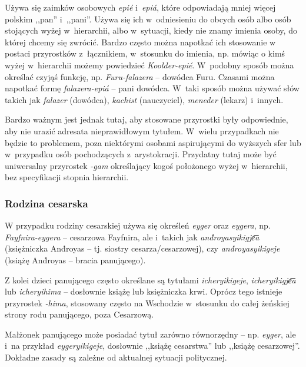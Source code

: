 \begin{spacing}{1.1}
\skipline

Używa się zaimków osobowych \emph{epié} i~\emph{epiá}, które odpowiadają mniej
więcej polskim ,,pan'' i~,,pani''. Używa się ich w~odniesieniu do obcych osób albo
osób stojących wyżej w~hierarchii, albo w~sytuacji, kiedy nie znamy imienia 
osoby, do której chcemy się zwrócić. Bardzo często można napotkać ich stosowanie
w postaci przyrostków z~łącznikiem, w~stosunku do imienia, np. mówiąc o kimś
wyżej w~hierarchii możemy powiedzieć \emph{Koolder-epié}. W~podobny sposób
można określać czyjąś funkcję, np. \emph{Furu-falazera} -- dowódca Furu. Czasami
można napotkać formę \emph{falazera-epiá} -- pani dowódca. W~taki sposób można
używać słów takich jak \emph{falazer} (dowódca), \emph{kachist} (nauczyciel), 
\emph{meneder} (lekarz) i~innych.

Bardzo ważnym jest jednak tutaj, aby stosowane przyrostki były odpowiednie, aby
nie urazić adresata nieprawidłowym tytułem. W~wielu przypadkach nie będzie to
problemem, poza niektórymi osobami aspirującymi do wyższych sfer lub w~przypadku
osób pochodzących z~arystokracji. Przydatny tutaj może być uniwersalny 
przyrostek \emph{-gam} określający kogoś położonego wyżej w~hierarchii, bez
specyfikacji stopnia hierarchii.

\subsubsection{Rodzina cesarska}

W przypadku rodziny cesarskiej używa się określeń \emph{eyger} oraz 
\emph{eygera}, np. \emph{Fayfnira-eygera} -- cesarzowa Fayfnira, ale i~takich jak 
\emph{and́royasyikigje͞a} (księżniczka And́royas -- tj. siostry cesarza/cesarzowej),
czy \emph{and́royasyikigeje} (książę And́royas -- bracia panującego).

Z kolei dzieci panującego często określane są tytułami \emph{icheryikigeje}, 
\emph{icheryikigje͞a} lub \emph{icheryihima} -- dosłownie książę lub księżniczka 
krwi. Oprócz tego istnieje przyrostek \emph{-hima}, stosowany często na 
Wschodzie w~stosunku do całej żeńskiej strony rodu panującego, poza Cesarzową.

Małżonek panującego może posiadać tytuł zarówno równorzędny -- np. \emph{eyger},
ale i~na przykład \emph{eygeryikigeje}, dosłownie ,,książę cesarstwa'' lub 
,,książę cesarzowej''. Dokładne zasady są zależne od aktualnej sytuacji 
politycznej.


\end{spacing}
